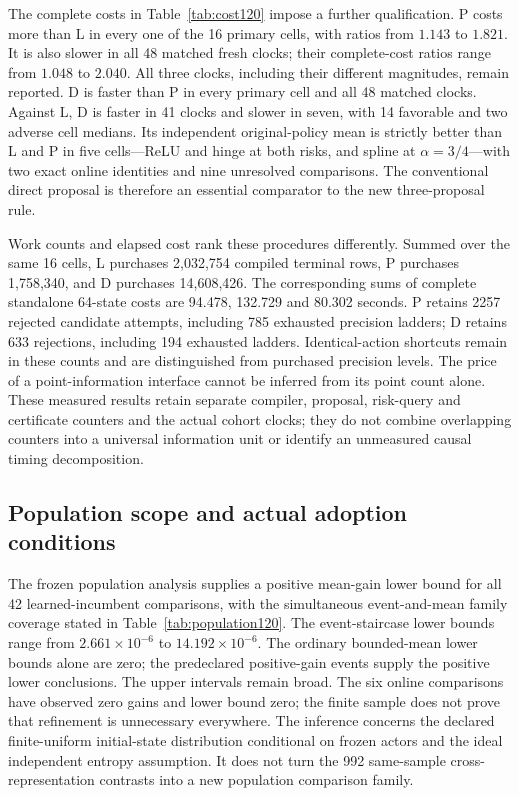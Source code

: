 The complete costs in Table~\ref{tab:cost120} impose a further qualification.
P costs more than L in every one of the 16 primary cells, with ratios from
$1.143$ to $1.821$. It is also slower in all 48 matched fresh clocks; their
complete-cost ratios range from $1.048$ to $2.040$. All three clocks, including
their different magnitudes, remain reported. D is faster than P in every
primary cell and all 48 matched clocks. Against L, D is faster in 41 clocks
and slower in seven, with 14 favorable and two adverse cell medians. Its
independent original-policy mean is strictly better than L and P in five
cells---ReLU and hinge at both risks, and spline at $\alpha=3/4$---with two
exact online identities and nine unresolved comparisons. The conventional
direct proposal is therefore an essential comparator to the new
three-proposal rule.

Work counts and elapsed cost rank these procedures differently. Summed over
the same 16 cells, L purchases 2,032,754 compiled terminal rows, P purchases
1,758,340, and D purchases 14,608,426. The corresponding sums of complete
standalone 64-state costs are 94.478, 132.729 and 80.302 seconds. P retains
2257 rejected candidate attempts, including 785 exhausted precision ladders;
D retains 633 rejections, including 194 exhausted ladders. Identical-action
shortcuts remain in these counts and are distinguished from purchased
precision levels. The price of a point-information interface cannot be
inferred from its point count alone. These measured results retain separate
compiler, proposal, risk-query and certificate counters and the actual
cohort clocks; they do not combine overlapping counters into a universal
information unit or identify an unmeasured causal timing decomposition.

\subsection{Population scope and actual adoption conditions}
\label{sec:adoptioninterpretation120}

The frozen population analysis supplies a positive mean-gain lower bound for
all 42 learned-incumbent comparisons, with the simultaneous event-and-mean
family coverage stated in Table~\ref{tab:population120}. The event-staircase
lower bounds range from $2.661\times10^{-6}$ to $14.192\times10^{-6}$.
The ordinary bounded-mean lower bounds alone are zero; the predeclared
positive-gain events supply the positive lower conclusions. The upper
intervals remain broad. The six online comparisons have observed zero gains
and lower bound zero; the finite sample does not prove that refinement is
unnecessary everywhere. The inference concerns the declared finite-uniform
initial-state distribution conditional on frozen actors and the ideal
independent entropy assumption. It does not turn the 992 same-sample
cross-representation contrasts into a new population comparison family.

